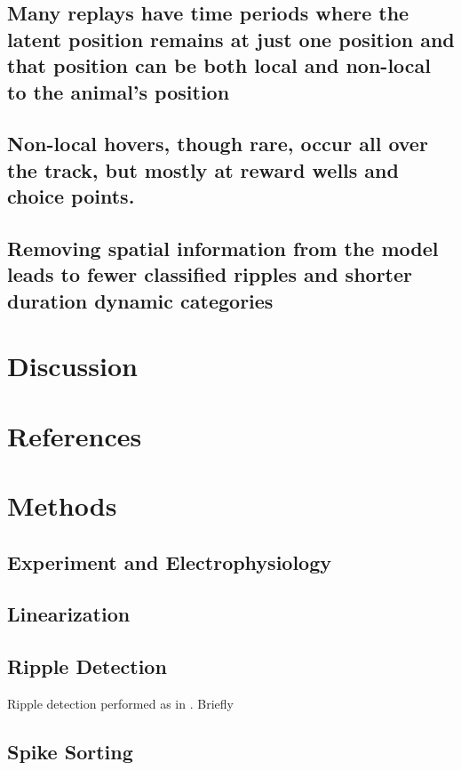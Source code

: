 \documentclass[times, twoside]{zHenriquesLab-StyleBioRxiv}
\begin{document}
\subsection*{Many replays have time periods where the latent position remains at just one position and that position can be both local and non-local to the animal's position}
\subsection*{Non-local hovers, though rare, occur all over the track, but mostly at reward wells and choice points.}

\subsection*{Removing spatial information from the model leads to fewer classified ripples and shorter duration dynamic categories}

\section*{Discussion}


\begin{acknowledgements}
\end{acknowledgements}

\section*{References}


\onecolumn
\newpage

\section*{Methods}
\subsection*{Experiment and Electrophysiology}
\subsection*{Linearization}
\subsection*{Ripple Detection}
Ripple detection performed as in \cite{Kayhippocampalnetworkspatial2016}. Briefly
\subsection*{Spike Sorting}
\end{document}
